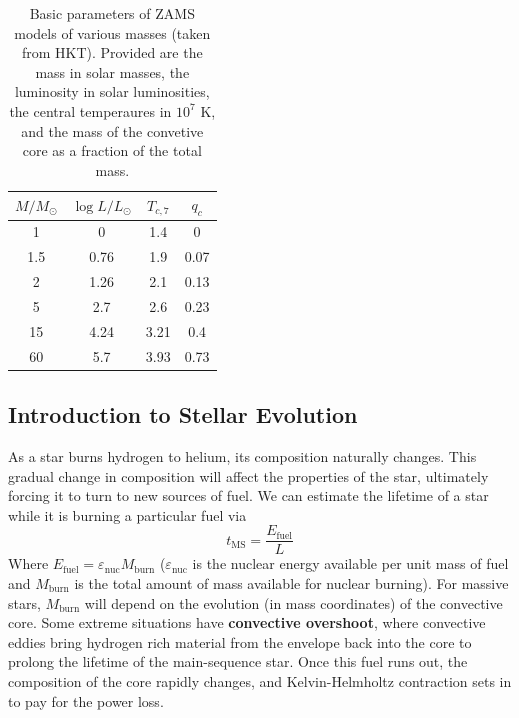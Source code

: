 \documentclass[10pt]{article}
\numberwithin{equation}{section}
\begin{document}
		\begin{table}[htb]
			\centering
			\begin{tabular}{c c c c}
			$M/M_\odot$ & $\log L/L_\odot$ & $T_{c,7}$ & $q_c$\\
			\hline \hline
			1 & 0 & 1.4 & 0\\
			1.5 & 0.76 & 1.9 & 0.07\\
			2 & 1.26 & 2.1 & 0.13\\
			5 & 2.7 & 2.6 & 0.23\\
			15 & 4.24 & 3.21 & 0.4\\
			60 & 5.7 & 3.93 & 0.73
			\end{tabular}
			\caption{Basic parameters of ZAMS models of various masses (taken from
			HKT). Provided are the mass in solar masses, the luminosity in solar
			luminosities, the central temperaures in $10^7$ K, and the mass of the
			convetive core as a fraction of the total mass.}
			\label{tab:ZAMS}
		\end{table}

    \subsection{Introduction to Stellar Evolution}
    \label{sec:stellar-evolution}

    As a star burns hydrogen to helium, its composition naturally
    changes. This gradual change in composition will affect the
    properties of the star, ultimately forcing it to turn to new
    sources of fuel. We can estimate the lifetime of a star while it
    is burning a particular fuel via
    \begin{equation}
      \label{eq:193}
      t_{\mathrm{MS}}=\frac{E_{\mathrm{fuel}}}{L}
    \end{equation}
    Where $E_{\mathrm{fuel}}=\varepsilon_{\mathrm{nuc}}M_{\mathrm{burn}}$
    ($\varepsilon_{\mathrm{nuc}}$ is the nuclear energy available per unit mass
    of fuel and $M_{\mathrm{burn}}$ is the total amount of mass available for
    nuclear burning). For massive stars, $M_{\mathrm{burn}}$ will depend on the
    evolution (in mass coordinates) of the convective core. Some extreme
    situations have \textbf{convective overshoot}, where convective eddies
    bring hydrogen rich material from the envelope back into the core to
    prolong the lifetime of the main-sequence star. Once this fuel runs out,
    the composition of the core rapidly changes, and Kelvin-Helmholtz
    contraction sets in to pay for the power loss.\\
\end{document}
